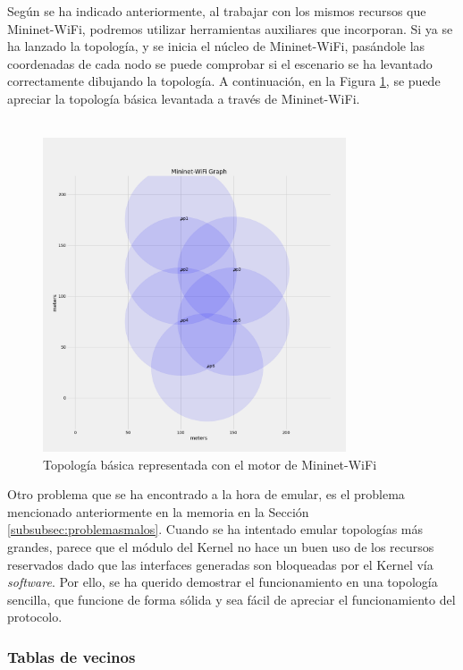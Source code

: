 Según se ha indicado anteriormente, al trabajar con los mismos recursos que Mininet-WiFi, podremos utilizar herramientas auxiliares que incorporan. Si ya se ha lanzado la topología, y se inicia el núcleo de Mininet-WiFi, pasándole las coordenadas de cada nodo se puede comprobar si el escenario se ha levantado correctamente dibujando la topología. A continuación, en la Figura \ref{fig:topo_val_mininetWifi}, se puede apreciar la topología básica levantada a través de Mininet-WiFi.\\
\\

\begin{figure}[ht]
    \centering
    \includegraphics[width=0.8\textwidth]{archivos/img/dev/topo_val_mininetWifi.png}
    \caption{Topología básica representada con el motor de Mininet-WiFi}
    \label{fig:topo_val_mininetWifi}
\end{figure}

Otro problema que se ha encontrado a la hora de emular, es el problema mencionado anteriormente en la memoria en la Sección \ref{subsubsec:problemasmalos}. Cuando se ha intentado emular topologías más grandes, parece que el módulo del Kernel no hace un buen uso de los recursos reservados dado que las interfaces generadas son bloqueadas por el Kernel vía \textit{software}. Por ello, se ha querido demostrar el funcionamiento en una topología sencilla, que funcione de forma sólida y sea fácil de apreciar el funcionamiento del protocolo.

\subsubsection{Tablas de vecinos}

